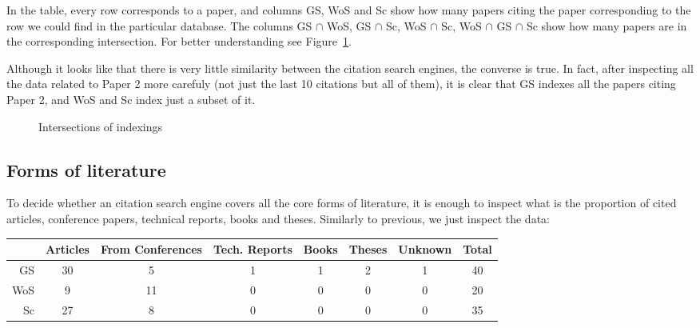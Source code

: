 \documentclass{lmcs}
\newenvironment{centeredData}{%
    \medskip%
    \begin{center}%
}{%
    \end{center}%
    \medskip%
}
\begin{document}
In the table, every row corresponds to a paper, and columns GS, WoS and Sc show how many papers citing the paper corresponding to the row we could find in the particular database. The columns GS $\cap$ WoS, GS $\cap$ Sc, WoS $\cap$ Sc, WoS $\cap$ GS $\cap$ Sc show how many papers are in the corresponding intersection. For better understanding see Figure~\ref{pic:circles}.

Although it looks like that there is very little similarity between the citation search engines, the converse is true. In fact, after inspecting all the data related to Paper 2 more carefuly (not just the last 10 citations but all of them), it is clear that GS indexes all the papers citing Paper 2, and WoS and Sc index just a subset of it.

\begin{figure}[!h]
\caption{Intersections of indexings}
\label{pic:circles}
\end{figure}

\subsection{Forms of literature}

To decide whether an citation search engine covers all the core forms of literature, it is enough to inspect what is the proportion of cited articles, conference papers, technical reports, books and theses. Similarly to previous, we just inspect the data:

\begin{centeredData}
\begin{tabular}{r|c c c c c c|c}
    & Articles & From Conferences & Tech. Reports & Books & Theses & Unknown & Total \\
\hline
GS  & 30 & 5 & 1 & 1 & 2 & 1 & 40 \\
WoS & 9 & 11 & 0 & 0 & 0 & 0 & 20 \\
Sc  & 27 & 8 & 0 & 0 & 0 & 0 & 35
\end{tabular}
\end{centeredData}
\end{document}
